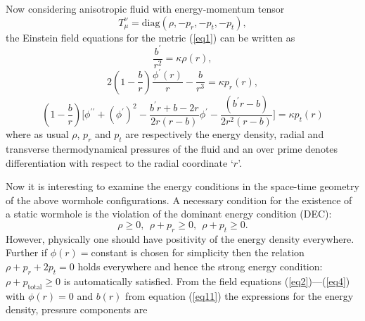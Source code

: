 \documentclass[10pt]{revtex4}
\begin{document}
\par
Now considering anisotropic fluid with energy-momentum tensor
$$T_\mu^\nu=\text{diag}(\rho, -p_r, -p_t, -p_t),$$
the Einstein field equations for the metric (\ref{eq1}) can be written as \cite{r14.0}
\begin{equation}\label{eq2}
\frac{b^\prime}{r^2}=\kappa\rho(r),
\end{equation}
\begin{equation}\label{eq3}
2\left(1-\frac{b}{r}\right)\frac{\phi^\prime(r)}{r}-\frac{b}{r^3}=\kappa p_{r}(r),
\end{equation}
\begin{equation}\label{eq4}
\left(1-\frac{b}{r}\right)\big[{\phi^{\prime\prime}}+({\phi^\prime})^2-\frac{b^\prime r+b-2r}{2r(r-b)}{\phi^\prime}-\frac{(b^\prime r-b)}{2r^2(r-b)}\big]=\kappa p_t(r)
\end{equation}
where as usual $\rho$, $p_r$ and $p_t$ are respectively the energy density, radial and transverse thermodynamical pressures of the fluid and an over prime denotes differentiation with respect to the radial coordinate `$r$'. 
\par
Now it is interesting to examine the energy conditions in the space-time geometry of the above wormhole configurations. A necessary condition for the existence of a static wormhole is the violation of the dominant energy condition (DEC):
$$ \rho \geq0,~~ \rho+p_r\geq0,~~ \rho+p_t\geq0 .$$
However, physically one should have positivity of the energy density everywhere. Further if $\phi(r)=$constant is chosen for simplicity then the relation $\rho+p_r+2p_t=0$ holds everywhere and hence the strong energy condition:$\rho+p_{\text{total}}\geq0$ is automatically satisfied. From the field equations (\ref{eq2})---(\ref{eq4}) with $\phi(r)=0$ and $b(r)$ from equation (\ref{eq11}) the expressions for the energy density, pressure components are
\end{document}
